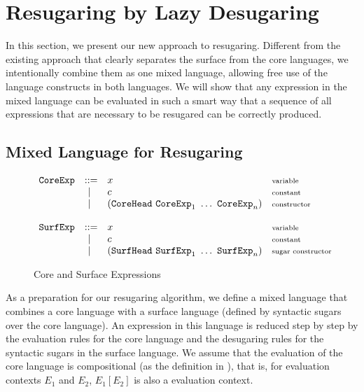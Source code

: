 
\section{Resugaring by Lazy Desugaring}
\label{sec3}

In this section, we present our new approach to resugaring. Different from the existing approach that clearly separates the surface from the core languages, we intentionally combine them as one mixed language, allowing free use of the language constructs in both languages. We will show that any expression in the mixed language can be evaluated in such a smart way that a sequence of all expressions that are necessary to be resugared can be correctly produced.

\subsection{Mixed Language for Resugaring}

\begin{figure}[t]
\begin{flushleft}
{\footnotesize
\[
\begin{array}{lllll}
\mbox{\tt CoreExp} &::=& x  & \mbox{{\scriptsize variable}}\\
&~|~& c  & \mbox{{\scriptsize constant}}\\
&~|~& (\mbox{\tt CoreHead}~\mbox{\tt CoreExp}_1~\ldots~\mbox{\tt CoreExp}_n) & \mbox{{\scriptsize constructor}}\\
\\
\mbox{\tt SurfExp} &::=& x  & \mbox{{\scriptsize variable}}\\
&~|~& c  & \mbox{{\scriptsize constant}}\\
&~|~& (\mbox{\tt SurfHead}~\mbox{\tt SurfExp}_1~\ldots~\mbox{\tt SurfExp}_n) & \mbox{{\scriptsize sugar constructor}}\\
\end{array}
\]
}
\end{flushleft}


	\caption{Core and Surface Expressions}
	\label{fig:expression}
\end{figure}

As a preparation for our resugaring algorithm, we define a mixed language that combines a core language with a surface language (defined by syntactic sugars over the core language). An expression in this language is reduced step by step by the evaluation rules for the core language and the desugaring rules for the syntactic sugars in the surface language. We assume that the evaluation of the core language is  compositional (as the definition in \cite{hygienic}), that is, for evaluation contexts $E_1$ and $E_2$, $E_1[E_2]$ is also a evaluation context.
